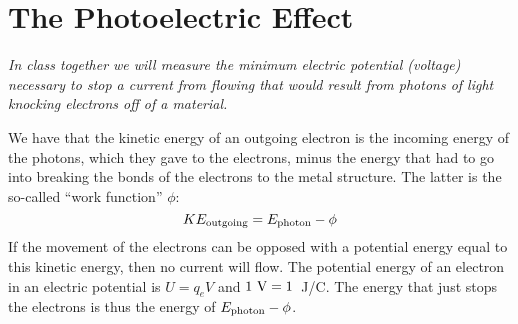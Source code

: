 \section{The Photoelectric Effect}

\makelabheader %

\bigskip

\textit{In class together we will measure the minimum electric potential (voltage) necessary to stop a current from flowing that would result from photons of light knocking electrons off of a material.}

We have that the kinetic energy of an outgoing electron is the incoming energy of the photons, which they gave to the electrons, minus the energy that had to go into breaking the bonds of the electrons to the metal structure.  The latter is the so-called ``work function'' $\phi$:
$$KE_{\rm outgoing} = E_{\rm photon} - \phi$$
If the movement of the electrons can be opposed with a potential energy equal to this kinetic energy, then no current will flow.  The potential energy of an electron in an electric potential is $U=q_e V$ and $1~{\rm V}=1$~J/C.  The energy that just stops the electrons is thus the energy of $E_{\rm photon} - \phi$.  

